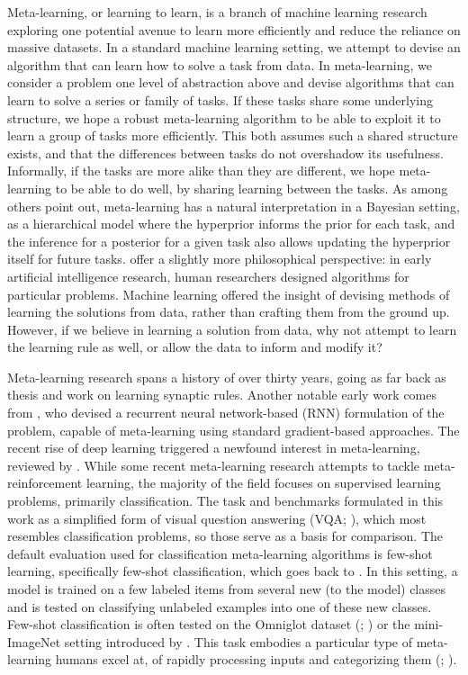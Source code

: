 Meta-learning, or learning to learn, is a branch of machine learning research exploring one potential avenue to learn more efficiently and reduce the reliance on massive datasets. In a standard machine learning setting, we attempt to devise an algorithm that can learn how to solve a task from data. In meta-learning, we consider a problem one level of abstraction above and devise algorithms that can learn to solve a series or family of tasks. If these tasks share some underlying structure, we hope a robust meta-learning algorithm to be able to exploit it to learn a group of tasks more efficiently. This both assumes such a shared structure exists, and that the differences between tasks do not overshadow its usefulness. Informally, if the tasks are more alike than they are different, we hope meta-learning to be able to do well, by sharing learning between the tasks. As \textcite{Hochreiter2001} among others point out, meta-learning has a natural interpretation in a Bayesian setting, as a hierarchical model where the hyperprior informs the prior for each task, and the inference for a posterior for a given task also allows updating the hyperprior itself for future tasks. \textcite{Lansdell2018} offer a slightly more philosophical perspective: in early artificial intelligence research, human researchers designed algorithms for particular problems. Machine learning offered the insight of devising methods of learning the solutions from data, rather than crafting them from the ground up. However, if we believe in learning a solution from data, why not attempt to learn the learning rule as well, or allow the data to inform and modify it? 

Meta-learning research spans a history of over thirty years, going as far back as  thesis and work on learning synaptic rules. Another notable early work comes from \textcite{Hochreiter2001}, who devised a recurrent neural network-based (RNN) formulation of the problem, capable of meta-learning using standard gradient-based approaches. The recent rise of deep learning triggered a newfound interest in meta-learning, reviewed by \textcite{Lansdell2018}. While some recent meta-learning research attempts to tackle meta-reinforcement learning, the majority of the field focuses on supervised learning problems, primarily classification. The task and benchmarks formulated in this work as a simplified form of visual question answering (VQA; \cite{Antol2015}), which most resembles classification problems, so those serve as a basis for comparison. The default evaluation used for classification meta-learning algorithms is few-shot learning, specifically few-shot classification, which goes back to \textcite{LiFei-Fei2006}. In this setting, a model is trained on a few labeled items from several new (to the model) classes and is tested on classifying unlabeled examples into one of these new classes. Few-shot classification is often tested on the Omniglot dataset (\cite{Lake2015}; \cite{Lake2019}) or the mini-ImageNet setting introduced by \textcite{Vinyals2016}. This task embodies a particular type of meta-learning humans excel at, of rapidly processing inputs and categorizing them (\cite{Thorpe1996}; \cite{FeiFei2002}).

